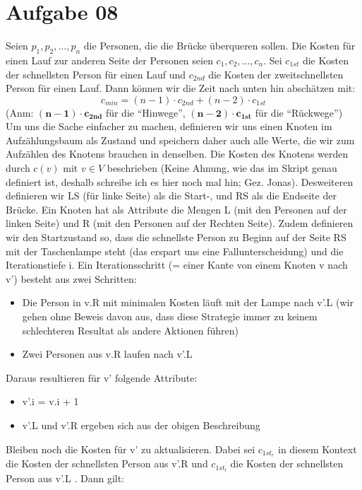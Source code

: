 \documentclass[10pt,a4paper]{article}
\begin{document}
\section*{Aufgabe 08}
    Seien ${p_1, p_2, \ldots, p_n}$ die Personen, die die Br\"ucke \"uberqueren
    sollen. Die Kosten f\"ur einen Lauf zur anderen Seite der Personen seien
    $c_1, c_2, \ldots, c_n$. Sei $c_{1st}$ die Kosten der schnellsten Person
    f\"ur einen Lauf und $c_{2nd}$ die Kosten der zweitschnellsten Person
    f\"ur einen Lauf. Dann k\"onnen wir die Zeit nach unten hin absch\"atzen mit:
    $$
        c_{min} = (n-1) \cdot c_{2nd} + (n-2) \cdot c_{1st}
    $$
    (Anm: $\mathbf{(n-1) \cdot c_{2nd}}$ f\"ur die ``Hinwege'',
    $\mathbf{(n-2) \cdot c_{1st}}$ f\"ur die ``R\"uckwege'') \\
    Um uns die Sache einfacher zu machen, definieren wir uns einen Knoten
    im Aufz\"ahlungsbaum als Zustand und speichern daher auch alle
    Werte, die wir zum Aufz\"ahlen des Knotens brauchen in denselben.
    Die Kosten des Knotens werden durch $c(v)$ mit $v \in V$ beschrieben
    (Keine Ahnung, wie das im Skript genau definiert ist, deshalb schreibe ich
    es hier noch mal hin; Gez. Jonas).
    Desweiteren definieren wir LS (f\"ur linke Seite) als die Start-,
    und RS als die Endseite der Br\"ucke.
    Ein Knoten hat als Attribute die Mengen L (mit den Personen auf der
    linken Seite) und R (mit den Personen auf der Rechten Seite).
    Zudem definieren wir den Startzustand so, dass die schnellste Person
    zu Beginn auf der Seite RS mit der Taschenlampe steht (das erspart
    uns eine Fallunterscheidung)
    und die Iterationstiefe i. Ein Iterationsschritt (= einer Kante von einem
    Knoten v nach v') besteht aus zwei Schritten:
    \begin{itemize}
        \item Die Person in v.R mit minimalen Kosten l\"auft mit der Lampe nach
              v'.L (wir gehen ohne Beweis davon aus, dass diese Strategie immer
              zu keinem schlechteren Resultat als andere Aktionen f\"uhren)
        \item Zwei Personen aus v.R laufen nach v'.L
    \end{itemize}
    Daraus resultieren f\"ur v' folgende Attribute:
    \begin{itemize}
        \item v'.i = v.i + 1
        \item v'.L und v'.R ergeben sich aus der obigen Beschreibung
    \end{itemize}
    Bleiben noch die Kosten f\"ur v' zu aktualisieren. Dabei sei $c_{1st_r}$ in diesem
    Kontext die Kosten der schnellsten Person aus v'.R und $c_{1st_l}$ die Kosten
    der schnellsten Person aus v'.L . Dann gilt:
\end{document}
